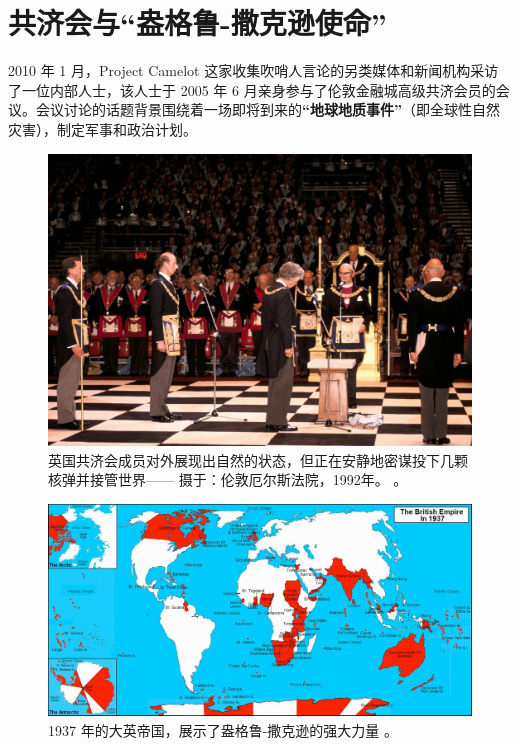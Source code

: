 \documentclass[10pt,twocolumn,letterpaper]{article}
\begin{document}
\section{共济会与“盎格鲁-撒克逊使命”}

2010 年 1 月，Project Camelot 这家收集吹哨人言论的另类媒体和新闻机构采访了\cite{4,6}一位内部人士，该人士于 2005 年 6 月亲身参与了伦敦金融城高级共济会员的会议。会议讨论的话题背景围绕着一场即将到来的\textbf{“地球地质事件”}（即全球性自然灾害），制定军事和政治计划。

\begin{figure}[b]
\begin{center}
   \includegraphics[width=1\linewidth]{freemason.jpg}

\end{center}
   \caption{英国共济会成员对外展现出自然的状态，但正在安静地密谋投下几颗核弹并接管世界—— 摄于：伦敦厄尔斯法院，1992年。 \cite{5}。}
\label{fig:1}
\label{fig:onecol}
\end{figure}

\begin{figure}[t]
\begin{center}
\includegraphics[width=1\textwidth]{british.jpg}
\end{center}
   \caption{1937 年的大英帝国，展示了盎格鲁-撒克逊的强大力量 \cite{14}。}
   \label{fig:2}
\end{figure}
\end{document}

